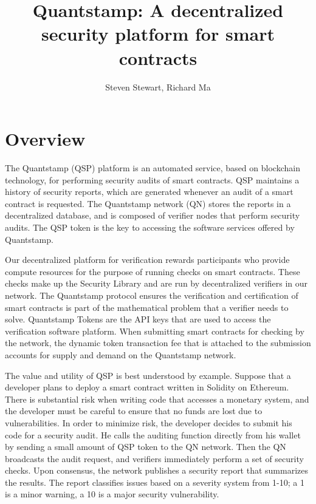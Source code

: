 \documentclass{llncs}
\begin{document}
\title{Quantstamp: A decentralized security platform for smart contracts}
\author{Steven Stewart, Richard Ma}
\maketitle

\section{Overview}
The Quantstamp (QSP) platform is an automated service, based on blockchain technology, for performing security audits of smart contracts. QSP maintains a history of security reports, which are generated whenever an audit of a smart contract is requested. The Quantstamp network (QN) stores the reports in a decentralized database, and is composed of verifier nodes that perform security audits. The QSP token is the key to accessing the software services offered by Quantstamp.

Our decentralized platform for verification rewards participants who provide compute resources for the purpose of running checks on smart contracts. These checks make up the Security Library and are run by decentralized verifiers in our network. The Quantstamp protocol ensures the verification and certification of smart contracts is part of the mathematical problem that a verifier needs to solve. Quantstamp Tokens are the API keys that are used to access the verification software platform. When submitting smart contracts for checking by the network, the dynamic token transaction fee that is attached to the submission accounts for supply and demand on the Quantstamp network. 

The value and utility of QSP is best understood by example. Suppose that a developer plans to deploy a smart contract written in Solidity on Ethereum. There is substantial risk when writing code that accesses a monetary system, and the developer must be careful to ensure that no funds are lost due to vulnerabilities. In order to minimize risk, the developer decides to submit his code for a security audit. He calls the auditing function directly from his wallet by sending a small amount of QSP token to the QN network. Then the QN broadcasts the audit request, and verifiers immediately perform a set of security checks. Upon consensus, the network publishes a security report that summarizes the results. The report classifies issues based on a severity system from 1-10; a 1 is a minor warning, a 10 is a major security vulnerability. 
\end{document}

